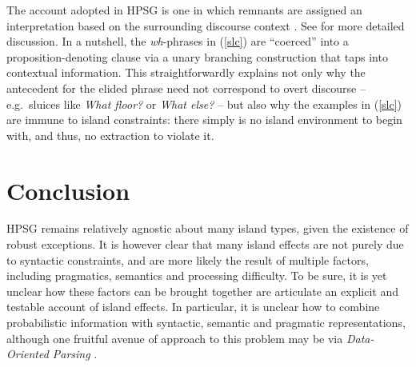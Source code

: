 \documentclass[output=paper
                ,modfonts
                ,nonflat
	        ,collection
	        ,collectionchapter
	        ,collectiontoclongg
 	        ,biblatex
                ,babelshorthands
                ,newtxmath
                ,draftmode
                ,colorlinks, citecolor=brown
]{./langsci/langscibook}
\begin{document}
\eal  \label{slc}



\zl

The  account adopted in HPSG is one in which remnants  are assigned an interpretation based on the surrounding discourse context  \citep{ginzsag,Culicover:Jackendoff:05,jacobson08,sagn}. 
See  for more detailed discussion. In a nutshell,  the \emph{wh}-phrases in (\ref{slc}) are ``coerced'' into a proposition-denoting clause via a unary branching construction that taps into contextual information.  This straightforwardly explains not only why the antecedent for the elided phrase need not correspond to  overt discourse --  e.g.\ sluices like \emph{What floor?} or \emph{What else?} --
but also  why the examples in (\ref{slc})  are immune to island constraints: there simply is no island
 environment to begin with, and thus, no extraction to violate it.



\section{Conclusion}

HPSG remains relatively agnostic about many island types, given the existence of robust exceptions.
It is however clear that many island effects are not purely due to syntactic constraints, and are more likely
the result of multiple factors, including pragmatics, semantics and processing difficulty.
To be sure, it is yet unclear how these factors can be brought together are articulate an explicit
and testable account of island effects. In particular, it is unclear how to combine probabilistic information with syntactic, semantic and pragmatic representations, although one fruitful avenue of approach to this problem may be via  \emph{Data-Oriented Parsing} \citep{NF2002a-u,NF99a,Arnold:Linardaki:07,BSS2003a-ed,Bod2009a}.  
\end{document}
